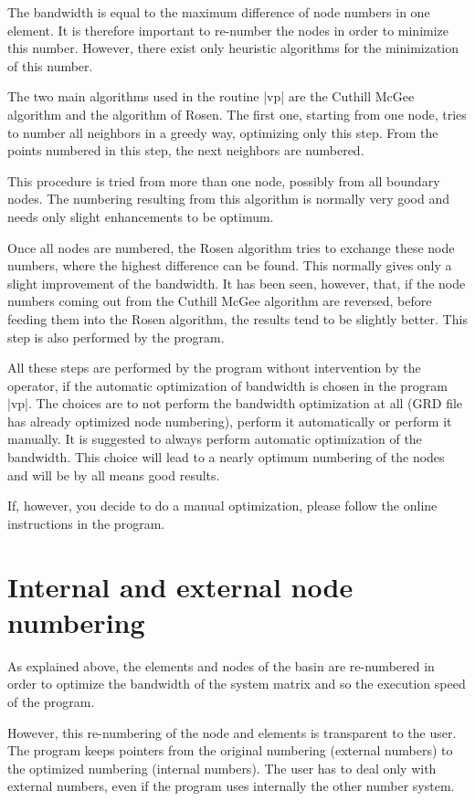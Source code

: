 \documentclass{report}
\begin{document}
The bandwidth is equal to the maximum difference of node numbers
in one element. It is therefore important to re-number the
nodes in order to minimize this number. However, there exist
only heuristic algorithms for the minimization of this number.

The two main algorithms used in the routine |vp| are
the Cuthill McGee algorithm and the algorithm of Rosen. The first
one, starting from one node, tries to number all neighbors in
a greedy way, optimizing only this step. From the points
numbered in this step, the next neighbors are numbered.

This procedure is tried from more than one node, possibly
from all boundary nodes. The numbering resulting from this
algorithm is normally very good and needs only slight
enhancements to be optimum.

Once all nodes are numbered, the Rosen algorithm tries to
exchange these node numbers, where the highest difference
can be found. This normally gives only a slight improvement
of the bandwidth. It has been seen, however, that, if the
node numbers coming out from the Cuthill McGee algorithm
are reversed, before feeding them into the Rosen algorithm, 
the results tend to be slightly better. This step is also
performed by the program.

All these steps are performed by the program without
intervention by the operator, if the automatic optimization
of bandwidth is chosen in the program |vp|. The choices
are to not perform the bandwidth optimization at all
(GRD file has already optimized node numbering), perform
it automatically or perform it manually. It is suggested
to always perform automatic optimization of the bandwidth.
This choice will lead to a nearly optimum numbering of the
nodes and will be by all means good results.

If, however, you decide to do a manual optimization, please
follow the online instructions in the program.

\section{Internal and external node numbering}

As explained above, the elements and nodes of the basin are re-numbered 
in order to optimize the bandwidth of the system matrix and so
the execution speed of the program. 

However, this re-numbering of the node and elements is transparent
to the user. The program keeps pointers from the original numbering
(external numbers) to the optimized numbering (internal numbers).
The user has to deal only with external numbers, even if the 
program uses internally the other number system.
\end{document}
